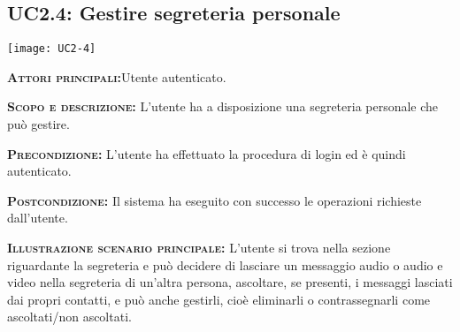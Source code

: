 \subsection{UC2.4: Gestire segreteria personale}
\begin{center}
\texttt{[image: UC2-4]}
\end{center}
\begin{description}
\item{\scshape\bfseries Attori principali:}Utente autenticato.
\item{\scshape\bfseries Scopo e descrizione:} L'utente ha a disposizione una segreteria personale che può gestire.
\item{\scshape\bfseries Precondizione:} L'utente ha effettuato la procedura di login ed è quindi autenticato.
\item{\scshape\bfseries Postcondizione:} Il sistema ha eseguito con successo le operazioni richieste dall'utente.
\item{\scshape\bfseries Illustrazione scenario principale:} L'utente si trova nella sezione riguardante la segreteria e può decidere di lasciare un messaggio audio o audio e video nella segreteria di un'altra persona, ascoltare, se presenti, i messaggi lasciati dai propri contatti, e può anche gestirli, cioè eliminarli o contrassegnarli come ascoltati/non ascoltati.
\end{description}

